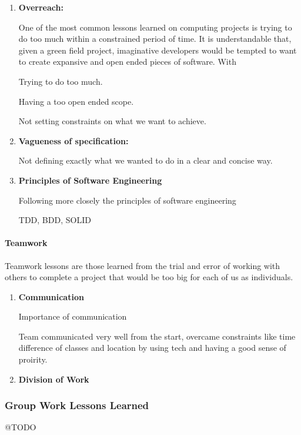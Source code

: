 \documentclass[11pt]{article}
\begin{document}
\begin{enumerate}
	
	\item \textbf{Overreach:}
	
	One of the most common lessons learned on computing projects is trying to do too much within a constrained period of time. It is understandable that, given a green field project, imaginative developers would be tempted to want to create expansive and open ended pieces of software. With 
	
	Trying to do too much. 
	
	Having a too open ended scope.
	
	Not setting constraints on what we want to achieve.
	
	\item \textbf{Vagueness of specification:}
	
	Not defining exactly what we wanted to do in a clear and concise way.
	
	\item \textbf{Principles of Software Engineering}
	
	Following more closely the principles of software engineering
	
	TDD, BDD, SOLID 
	
	
\end{enumerate}

\paragraph{Teamwork}

Teamwork lessons are those learned from the trial and error of working with others to complete a project that would be too big for each of us as individuals.

\begin{enumerate}
	
	\item \textbf{Communication}
	
	Importance of communication
	
	Team communicated very well from the start, overcame constraints like time difference of classes and location by using tech and having a good sense of proirity.
	
	\item \textbf{Division of Work}
	
	
	
	
\end{enumerate}

\subsubsection{Group Work Lessons Learned}
@TODO
\end{document}
